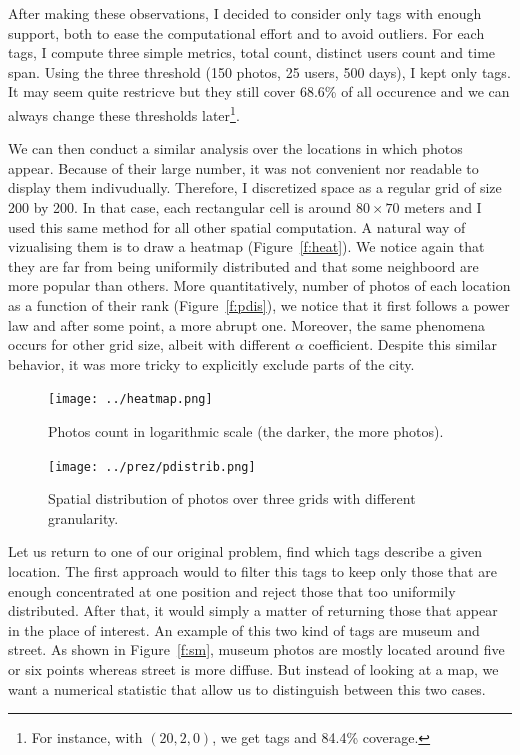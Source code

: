 After making these observations, I decided to consider only tags with enough
support, both to ease the computational effort and to avoid outliers. For each
tags, I compute three simple metrics, total count, distinct users count and
time span. Using the three threshold (150 photos, 25 users, 500 days), I kept
only  tags. It may seem quite restricve but they still cover
68.6\% of all occurence and we can always change these thresholds
later\footnote{For instance, with $(20, 2, 0)$, we get  tags
and 84.4\% coverage.}.

We can then conduct a similar analysis over the locations in which photos
appear. Because of their large number, it was not convenient nor readable to
display them indivudually. Therefore, I discretized space as a regular grid of
size 200 by 200. In that case, each rectangular cell is around $80\times 70$
meters and I used this same method for all other spatial computation. A
natural way of vizualising them is to draw a heatmap (Figure~\vref{f:heat}).
We notice again that they are far from being uniformily distributed and that
some neighboord are more popular than others. More quantitatively, number of
photos of each location as a function of their rank (Figure~\vref{f:pdis}), we
notice that it first follows a power law and after some point, a more
abrupt one. Moreover, the same phenomena occurs for other grid size, albeit
with different $\alpha$ coefficient. Despite this similar behavior, it was
more tricky to explicitly exclude parts of the city.

\begin{figure}[hbtp]
\texttt{[image: ../heatmap.png]}
\caption{Photos count in logarithmic scale (the darker, the more
photos).\label{f:heat}}
\end{figure}

\begin{figure}[hbtp]
\texttt{[image: ../prez/pdistrib.png]}
\caption{Spatial distribution of photos over three grids with different
granularity.\label{f:pdis}}
\end{figure}

Let us return to one of our original problem, find which tags describe a given
location. The first approach would to filter this  tags to keep
only those that are enough concentrated at one position and reject those that
too uniformily distributed. After that, it would simply a matter of returning
those that appear in the place of interest. An example of this two kind of
tags are \textsf{museum} and \textsf{street}. As shown in Figure~\vref{f:sm},
\textsf{museum} photos are mostly located around five or six points whereas
\textsf{street} is more diffuse. But instead of looking at a map, we want a
numerical statistic that allow us to distinguish between this two cases.


